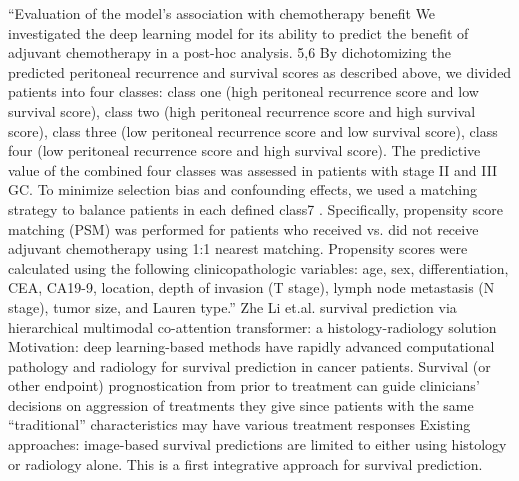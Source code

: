 \documentclass{article}%
\begin{document}
\newline%
\newline%
%
“Evaluation of the model’s association with chemotherapy benefit We investigated the deep learning model for its ability to predict the benefit of adjuvant chemotherapy in a post{-}hoc analysis. 5,6 By dichotomizing the predicted peritoneal recurrence and survival scores as described above, we divided patients into four classes: class one (high peritoneal recurrence score and low survival score), class two (high peritoneal recurrence score and high survival score), class three (low peritoneal recurrence score and low survival      score), class four (low peritoneal recurrence score and high survival score). The predictive value of the combined four classes was assessed in patients with stage II and III GC. To minimize selection bias and confounding effects, we used a matching strategy to balance patients in each defined class7 . Specifically, propensity score matching (PSM) was performed for patients who received vs. did not receive adjuvant chemotherapy using 1:1 nearest matching. Propensity scores were calculated using the following clinicopathologic variables: age, sex, differentiation, CEA, CA19{-}9, location, depth of invasion (T stage), lymph node metastasis (N stage), tumor size, and Lauren type.” %
\newline%
\newline%
%
Zhe Li et.al. survival prediction via hierarchical multimodal co{-}attention transformer: a histology{-}radiology solution %
\newline%
\newline%
%
Motivation: %
\newline%
\newline%
%
deep learning{-}based methods have rapidly advanced computational pathology and radiology for survival prediction in cancer patients. %
\newline%
\newline%
%
Survival (or other endpoint) prognostication from prior to treatment can guide clinicians’ decisions on aggression of treatments they give since patients with the same “traditional” characteristics may have various treatment responses%
\newline%
\newline%
%
Existing approaches: image{-}based survival predictions are limited to either using histology or radiology alone. This is a first integrative approach for survival prediction. %
\newline%
\newline%
\end{document}
